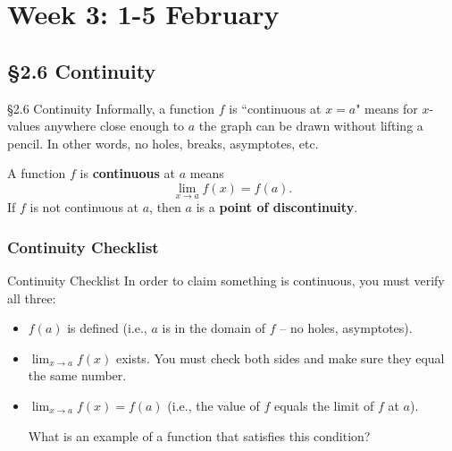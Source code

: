 \documentclass[Cal1Spr16Lectures.tex]{subfiles}
\begin{document}
\section[Week 3]{Week 3: 1-5 February}

\subsection[2.6 Continuity]{\S2.6 Continuity}

\begin{frame}{\S2.6 Continuity}\footnotesize
Informally, a function $f$ is ``continuous at $x=a$" means for $x$-values anywhere close enough to $a$ the graph can be drawn without lifting a pencil.  In other words, no holes, breaks, asymptotes, etc.
\begin{dfn} A function $f$ is {\bf continuous} at $a$ means
\[\lim_{x \to a} f(x)=f(a).\]  
If $f$ is not continuous at $a$, then $a$ is a {\bf point of discontinuity}. \end{dfn}
\end{frame}

\subsubsection{Continuity Checklist}

\begin{frame}{\small Continuity Checklist}\footnotesize
In order to claim something is continuous, you must verify all three:
\begin{itemize}
\item[1.] \alert{$f(a)$ is defined} (i.e., $a$ is in the domain of $f$ -- no holes, asymptotes).
\item[2.] \alert{$\displaystyle\lim_{x \to a} f(x)$ exists.}  You must check both sides and make sure they equal the same number.
\item[3.] \alert{$\displaystyle\lim_{x \to a} f(x) = f(a)$} (i.e., the value of $f$ equals the limit of $f$ at $a$).  
\begin{que} What is an example of a function that satisfies this condition? \end{que}
\end{itemize}
\end{frame}
\end{document}
